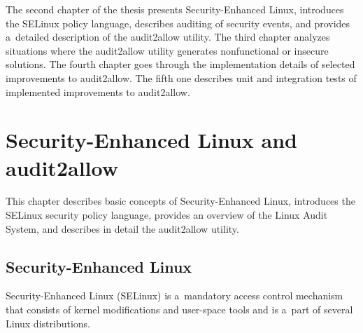 The second chapter of the thesis presents Security-Enhanced Linux, introduces
the SELinux policy language, describes auditing of security events, and provides
a~detailed description of the audit2allow utility. The third chapter analyzes
situations where the audit2allow utility generates nonfunctional or insecure
solutions. The fourth chapter goes through the implementation details of
selected improvements to audit2allow. The fifth one describes unit and
integration tests of implemented improvements to audit2allow.

\chapter{Security-Enhanced Linux and audit2allow}
\label{selinux}

This chapter describes basic concepts of Security-Enhanced Linux, introduces the
SELinux security policy language, provides an overview of the Linux Audit
System, and describes in detail the audit2allow utility.

\section{Security-Enhanced Linux}
Security-Enhanced Linux (SELinux) is a~mandatory access control mechanism that
consists of kernel modifications and user-space tools and is a~part of several
Linux distributions.

